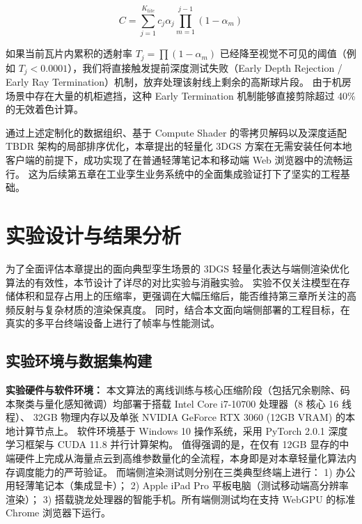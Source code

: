 \begin{equation}
    C = \sum_{j=1}^{K_{tile}} c_j \alpha_j \prod_{m=1}^{j-1}(1-\alpha_m)
\end{equation}

如果当前瓦片内累积的透射率 $T_j = \prod (1-\alpha_m)$ 已经降至视觉不可见的阈值（例如 $T_j < 0.0001$），我们将直接触发提前深度测试失败（Early Depth Rejection / Early Ray Termination）机制，放弃处理该射线上剩余的高斯球片段。
由于机房场景中存在大量的机柜遮挡，这种 Early Termination 机制能够直接剪除超过 40\% 的无效着色计算。

通过上述定制化的数据组织、基于 Compute Shader 的零拷贝解码以及深度适配 TBDR 架构的局部排序优化，本章提出的轻量化 3DGS 方案在无需安装任何本地客户端的前提下，成功实现了在普通轻薄笔记本和移动端 Web 浏览器中的流畅运行。
这为后续第五章在工业孪生业务系统中的全面集成验证打下了坚实的工程基础。


\section{实验设计与结果分析}
\label{sec:experiments}

为了全面评估本章提出的面向典型孪生场景的 3DGS 轻量化表达与端侧渲染优化算法的有效性，本节设计了详尽的对比实验与消融实验。
实验不仅关注模型在存储体积和显存占用上的压缩率，更强调在大幅压缩后，能否维持第三章所关注的高频反射与复杂材质的渲染保真度。
同时，结合本文面向端侧部署的工程目标，在真实的多平台终端设备上进行了帧率与性能测试。

\subsection{实验环境与数据集构建}
\label{subsec:exp_setup}

\textbf{实验硬件与软件环境：} 本文算法的离线训练与核心压缩阶段（包括冗余剔除、码本聚类与量化感知微调）均部署于搭载 Intel Core i7-10700 处理器（8 核心 16 线程）、
32GB 物理内存以及单张 NVIDIA GeForce RTX 3060 (12GB VRAM) 的本地计算节点上。
软件环境基于 Windows 10 操作系统，采用 PyTorch 2.0.1 深度学习框架与 CUDA 11.8 并行计算架构。
值得强调的是，在仅有 12GB 显存的中端硬件上完成从海量点云到高维参数量化的全流程，本身即是对本章轻量化算法内存调度能力的严苛验证。
而端侧渲染测试则分别在三类典型终端上进行：
1) 办公用轻薄笔记本（集成显卡）；
2) Apple iPad Pro 平板电脑（测试移动端高分辨率渲染）；
3) 搭载骁龙处理器的智能手机。所有端侧测试均在支持 WebGPU 的标准 Chrome 浏览器下运行。

